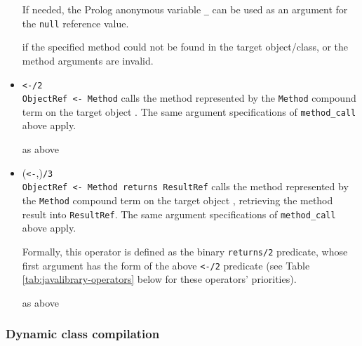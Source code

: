 \begin{itemize}
    If needed, the Prolog anonymous variable \texttt{\_} can be used as an argument for the \texttt{null} reference value.


     if the specified method could not be found in the target object/class, or the method arguments are invalid.

\item \verb|<-/2|\\
    \noindent\verb|ObjectRef <- Method| calls the method represented by the \texttt{Method} compound term on the target object . The same argument specifications of \texttt{method\_call} above apply.


    \exception{} as above

\item (\verb|<-|,)\texttt{/3}\\
    \noindent\verb|ObjectRef <- Method returns ResultRef| calls the method represented by the \texttt{Method} compound term on the target object , retrieving the method result into \texttt{ResultRef}. The same argument specifications of \texttt{method\_call} above apply.

    Formally, this operator is defined as the binary \texttt{returns/2} predicate, whose first argument has the form of the above \verb|<-/2| predicate (see Table \ref{tab:javalibrary-operators} below for these operators' priorities).


    \exception{} as above
\end{itemize}

\subsubsection{Dynamic class compilation}

